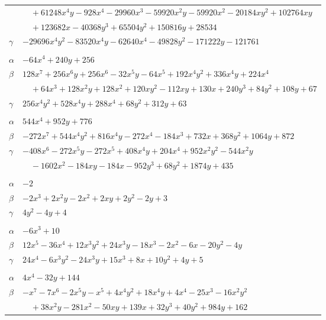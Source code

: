 \documentclass[11pt]{article}
\begin{document}
\begin{longtable}{@{}ll@{}}
 & $\quad +61248x^{4}y-928x^{4}-29960x^{3}-59920x^{2}y-59920x^{2}-20184xy^{2}+102764xy$\\
 & $\quad +123682x-40368y^{3}+65504y^{2}+150816y+28534$\\
$\gamma$ & $-29696x^{4}y^{2}-83520x^{4}y-62640x^{4}-49828y^{2}-171222y-121761$\\
\addlinespace[3pt]
\multicolumn{2}{@{}l}{$\{i,j\}=\{6,30\}$, $k_{ij}=2\cdot 3^{3}\cdot 7$}\\
$\alpha$ & $-64x^{4}+240y+256$\\
$\beta$ & $128x^{7}+256x^{6}y+256x^{6}-32x^{5}y-64x^{5}+192x^{4}y^{2}+336x^{4}y+224x^{4}$\\
 & $\quad +64x^{3}+128x^{2}y+128x^{2}+120xy^{2}-112xy+130x+240y^{3}+84y^{2}+108y+67$\\
$\gamma$ & $256x^{4}y^{2}+528x^{4}y+288x^{4}+68y^{2}+312y+63$\\
\addlinespace[3pt]
\multicolumn{2}{@{}l}{$\{i,j\}=\{6,31\}$, $k_{ij}=3^{5}$}\\
$\alpha$ & $544x^{4}+952y+776$\\
$\beta$ & $-272x^{7}+544x^{4}y^{2}+816x^{4}y-272x^{4}-184x^{3}+732x+368y^{2}+1064y+872$\\
$\gamma$ & $-408x^{6}-272x^{5}y-272x^{5}+408x^{4}y+204x^{4}+952x^{2}y^{2}-544x^{2}y$\\
 & $\quad -1602x^{2}-184xy-184x-952y^{3}+68y^{2}+1874y+435$\\
\addlinespace[3pt]
\multicolumn{2}{@{}l}{$\{i,j\}=\{7,12\}$, $k_{ij}=2$}\\
$\alpha$ & $-2$\\
$\beta$ & $-2x^{3}+2x^{2}y-2x^{2}+2xy+2y^{2}-2y+3$\\
$\gamma$ & $4y^{2}-4y+4$\\
\addlinespace[3pt]
\multicolumn{2}{@{}l}{$\{i,j\}=\{8,32\}$, $k_{ij}=2^{2}\cdot 5$}\\
$\alpha$ & $-6x^{3}+10$\\
$\beta$ & $12x^{5}-36x^{4}+12x^{3}y^{2}+24x^{3}y-18x^{3}-2x^{2}-6x-20y^{2}-4y$\\
$\gamma$ & $24x^{4}-6x^{3}y^{2}-24x^{3}y+15x^{3}+8x+10y^{2}+4y+5$\\
\addlinespace[3pt]
\multicolumn{2}{@{}l}{$\{i,j\}=\{9,20\}$, $k_{ij}=2^{3}\cdot 3^{2}\cdot 5$}\\
$\alpha$ & $4x^{4}-32y+144$\\
$\beta$ & $-x^{7}-7x^{6}-2x^{5}y-x^{5}+4x^{4}y^{2}+18x^{4}y+4x^{4}-25x^{3}-16x^{2}y^{2}$\\
 & $\quad +38x^{2}y-281x^{2}-50xy+139x+32y^{3}+40y^{2}+984y+162$\\

\end{longtable}
\end{document}
